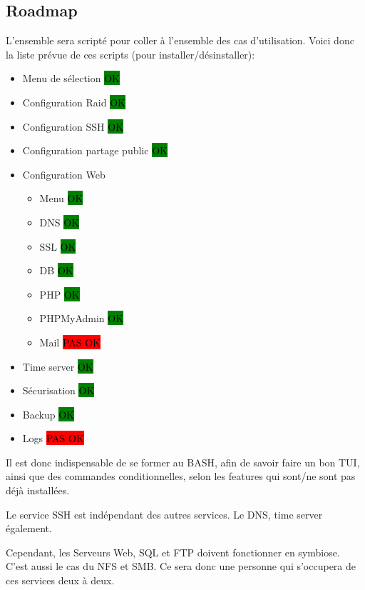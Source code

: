 \documentclass{article}
\begin{document}
\subsection{Roadmap}
L'ensemble sera scripté pour coller à l'ensemble des cas d'utilisation. Voici donc la liste prévue de ces scripts (pour installer/désinstaller):
\begin{itemize}
\item Menu de sélection											\colorbox{green}{\textcolor{black}{OK}}
\item Configuration Raid \colorbox{green}{\textcolor{black}{OK}}	
\item Configuration SSH \colorbox{green}{\textcolor{black}{OK}}						
\item Configuration partage public 
\colorbox{green}{\textcolor{black}{OK}}							
\item Configuration Web 
\begin{itemize}
\item Menu \colorbox{green}{\textcolor{black}{OK}}							
\item DNS \colorbox{green}{\textcolor{black}{OK}}							
\item SSL \colorbox{green}{\textcolor{black}{OK}}							
\item DB \colorbox{green}{\textcolor{black}{OK}}							
\item PHP \colorbox{green}{\textcolor{black}{OK}}							
\item PHPMyAdmin \colorbox{green}{\textcolor{black}{OK}}		
\item Mail 	\colorbox{red}{\textcolor{black}{PAS OK}}	
\end{itemize}
\item Time server \colorbox{green}{\textcolor{black}{OK}}
\item Sécurisation \colorbox{green}{\textcolor{black}{OK}}	
\item Backup \colorbox{green}{\textcolor{black}{OK}}	
\item Logs \colorbox{red}{\textcolor{black}{PAS OK}}	
		\end{itemize}
		
		
		Il est donc indispensable de se former au BASH, afin de savoir faire un bon TUI, ainsi que des commandes conditionnelles, selon les features qui sont/ne sont pas déjà installées.
		
		Le service SSH est indépendant des autres services. Le DNS, time server également.
		
		Cependant, les Serveurs Web, SQL et FTP doivent fonctionner en symbiose. C'est aussi le cas du NFS et SMB. Ce sera donc une personne qui s'occupera de ces services deux à deux.
	
\end{document}
